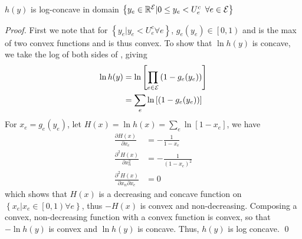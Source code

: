 \begin{lemma}
$h(y)$ is log-concave in domain $\left\{ y_e \in \R{\cE} | 0 \leq y_e < U^c_e \hspace{5px} \forall e \in \cE \right\}$
\end{lemma}
\begin{proof}
  First we note that for $\left\{ y_e | y_e < U^c_e \forall e \right\}$,  $g_e(y_e) \in \left[ 0, 1\right)$ and is the max of two convex functions and is thus convex. To show that $\ln h(y)$ is concave, we  take the log of both sides of , giving
\begin{align*}
\ln  h(y) & = \ln \left[ \prod_{e \in \mathcal{E}} \left( 1 - g_e(y_e) \right) \right] \\
&= \sum_e \ln \left[ \left( 1 - g_e(y_e) \right)\right]
\end{align*}
For $x_e = g_e(y_e)$, let $H(x) = \ln h(x) = \sum_e \ln \left[ 1- x_e \right]$, we have
\begin{align*}
\frac{\partial H(x)}{\partial x_e} &=  -\frac{1}{1-x_e}  \\
\frac{\partial^2 H(x)}{\partial x_n^2} &=  - \frac{1}{(1-x_e)^2} \\
\frac{\partial^2 H(x)}{\partial x_n \partial x_e} &=  0 
\end{align*}
which shows that $H(x)$ is a decreasing and concave function on $\left\{x_e | x_e \in \left[0,1\right) \forall e \right\}$, thus $-H(x)$ is convex and non-decreasing.  Composing a convex, non-decreasing function with a convex function is convex, so that $-\ln h(y)$ is convex and $\ln h(y)$ is concave.  Thus, $h(y)$ is log concave. \qed
\end{proof}


